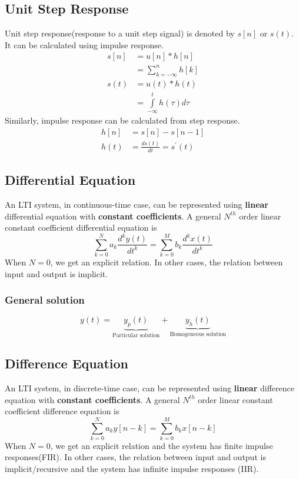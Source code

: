 \documentclass[oneside]{book}
\begin{document}
\subsection{Unit Step Response}
Unit step response(response to a unit step signal) is denoted by \(s[n]\) or \(s(t)\). It can be calculated using impulse response.
\begin{align*}
	s[n] & = u[n]*h[n]                             \\
	     & = \sum\limits_{k = -\infty}^{n}h[k]     \\
	s(t) & = u(t)*h(t)                             \\
	     & = \int\limits_{-\infty}^{t}h(\tau)d\tau
\end{align*}
Similarly, impulse response can be calculated from step response.
\begin{align*}
	h[n] & = s[n] - s[n-1]                  \\
	h(t) & = \frac{ds(t)}{dt} = s^\prime(t)
\end{align*}

\subsection{Differential Equation}
An LTI system, in continuous-time case, can be represented using \textbf{linear} differential equation with \textbf{constant coefficients}. A general \(N^{th}\) order linear constant coefficient differential equation is
\[
	\sum\limits_{k = 0}^{N}a_k\frac{d^ky(t)}{dt^k} = \sum\limits_{k = 0}^{M}b_k\frac{d^kx(t)}{dt^k}
\]
When \(N = 0\), we get an explicit relation. In other cases, the relation between input and output is implicit.
\subsubsection{General solution}
\[
	y(t) = \underbrace{y_p(t)}\limits_{\text{Particular solution}} + \underbrace{y_h(t)}\limits_{\text{Homogeneous solution}}
\]

\subsection{Difference Equation}
An LTI system, in discrete-time case, can be represented using \textbf{linear} difference equation with \textbf{constant coefficients}. A general \(N^{th}\) order linear constant coefficient difference equation is
\[
	\sum\limits_{k = 0}^{N}a_ky[n-k] = \sum\limits_{k = 0}^{M}b_kx[n-k]
\]
When \(N = 0\), we get an explicit relation and the system has finite impulse responses(FIR). In other cases, the relation between input and output is implicit/recursive and the system has infinite impulse responses (IIR).




\end{document}
